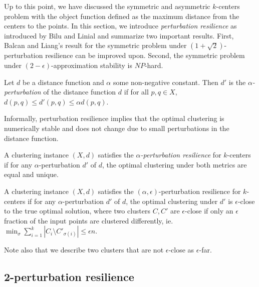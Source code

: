 Up to this point, we have discussed the symmetric and asymmetric $k$-centers problem with the object function defined as the maximum distance from the centers to the points. In this section, we introduce \emph{perturbation resilience} as introduced by Bilu and Linial and summarize two important results. First, Balcan and Liang's result for the symmetric problem under $(1+\sqrt2)$-perturbation resilience can be improved upon. Second, the symmetric problem under $(2-\epsilon)$-approximation stability is $NP$-hard.

\begin{definition}
Let $d$ be a distance function and $\alpha$ some non-negative constant. Then $d'$ is the \emph{$\alpha$-perturbation} of the distance function $d$ if for all $p,q\in X$, $d(p,q)\leq d'(p,q)\leq\alpha d(p,q)$.
\end{definition}

\begin{remark}
Informally, perturbation resilience implies that the optimal clustering is numerically stable and does not change due to small perturbations in the distance function.
\end{remark}

\begin{definition}
A clustering instance $(X,d)$ satisfies the \emph{$\alpha$-perturbation resilience} for $k$-centers if for any $\alpha$-perturbation $d'$ of $d$, the optimal clustering under both metrics are equal and unique.
\end{definition}

\begin{definition}
A clustering instance $(X,d)$ satisfies the $(\alpha,\epsilon)$-perturbation resilience for $k$-centers if for any $\alpha$-perturbation $d'$ of $d$, the optimal clustering under $d'$ is $\epsilon$-close to the true optimal solution, where two clusters $C,C'$ are $\epsilon$-close if only an $\epsilon$ fraction of the input points are clustered differently, ie. $\min_\sigma\sum_{i=1}^k|C_i\setminus C'_{\sigma(i)}|\leq\epsilon n$.
\end{definition}

\begin{remark}
Note also that we describe two clusters that are not $\epsilon$-close as $\epsilon$-far.
\end{remark}

\subsection{2-perturbation resilience}

